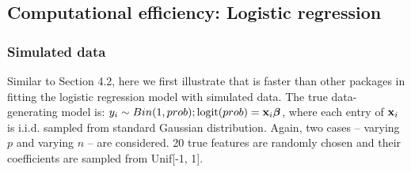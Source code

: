 
\subsection{Computational efficiency: Logistic regression}

\subsubsection{Simulated data}

Similar to Section 4.2, here we first illustrate that  is faster than other packages in fitting the logistic regression model with simulated data. The true data-generating model is: $y_i \sim Bin(1, prob); \textrm{logit}(prob) = \mathbf{x}_i \boldsymbol{\beta}$, where each entry of $\mathbf{x}_i$ is i.i.d. sampled from standard Gaussian distribution. Again, two cases -- varying $p$ and varying $n$ -- are considered. 20 true features are randomly chosen and their coefficients are sampled from Unif[-1, 1].


